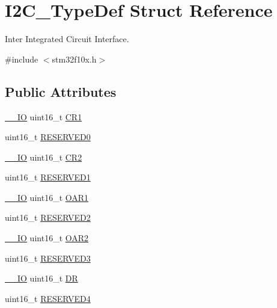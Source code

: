 \hypertarget{struct_i2_c___type_def}{}\section{I2\+C\+\_\+\+Type\+Def Struct Reference}
\label{struct_i2_c___type_def}


Inter Integrated Circuit Interface.  




{\ttfamily \#include $<$stm32f10x.\+h$>$}

\subsection*{Public Attributes}
\begin{DoxyCompactItemize}
\item 
\hyperlink{core__sc300_8h_aec43007d9998a0a0e01faede4133d6be}{\+\_\+\+\_\+\+IO} uint16\+\_\+t \hyperlink{struct_i2_c___type_def_ad35ea0b199cefb757de20e9b78168534}{C\+R1}
\item 
uint16\+\_\+t \hyperlink{struct_i2_c___type_def_aee6ec4cf81ee0bb5b038576ba0d738a2}{R\+E\+S\+E\+R\+V\+E\+D0}
\item 
\hyperlink{core__sc300_8h_aec43007d9998a0a0e01faede4133d6be}{\+\_\+\+\_\+\+IO} uint16\+\_\+t \hyperlink{struct_i2_c___type_def_ac8bff45acc455489620d50e697a24c9d}{C\+R2}
\item 
uint16\+\_\+t \hyperlink{struct_i2_c___type_def_a6c3d147223993f2b832b508ee5a5178e}{R\+E\+S\+E\+R\+V\+E\+D1}
\item 
\hyperlink{core__sc300_8h_aec43007d9998a0a0e01faede4133d6be}{\+\_\+\+\_\+\+IO} uint16\+\_\+t \hyperlink{struct_i2_c___type_def_ad218fdcb9606477c1d63f8ee38d3c5c9}{O\+A\+R1}
\item 
uint16\+\_\+t \hyperlink{struct_i2_c___type_def_a5e98c83a176deeb4a8a68f9ca12fdfd2}{R\+E\+S\+E\+R\+V\+E\+D2}
\item 
\hyperlink{core__sc300_8h_aec43007d9998a0a0e01faede4133d6be}{\+\_\+\+\_\+\+IO} uint16\+\_\+t \hyperlink{struct_i2_c___type_def_a03189e2a57c81ae5d103739b72f52c93}{O\+A\+R2}
\item 
uint16\+\_\+t \hyperlink{struct_i2_c___type_def_a355b2c5aa0dd467de1f9dea4a9afe986}{R\+E\+S\+E\+R\+V\+E\+D3}
\item 
\hyperlink{core__sc300_8h_aec43007d9998a0a0e01faede4133d6be}{\+\_\+\+\_\+\+IO} uint16\+\_\+t \hyperlink{struct_i2_c___type_def_a5c1551b886fbb8e801b9203f6d7dc7c5}{DR}
\item 
uint16\+\_\+t \hyperlink{struct_i2_c___type_def_a05a1a3482d9534ba9ef976e3277040f0}{R\+E\+S\+E\+R\+V\+E\+D4}

\end{DoxyCompactItemize}
